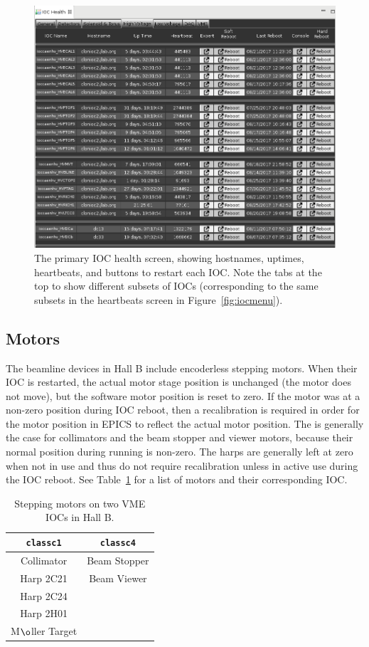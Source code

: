 \documentclass[amsmath,amssymb,notitlepage,11pt]{revtex4}
\begin{document}
\begin{figure}[htbp]\centering
  \includegraphics[width=\textwidth]{pics/iochealth}
  \caption{The primary IOC health screen, showing hostnames, uptimes, heartbeats, and buttons to restart each IOC.  Note the tabs at the top to show different subsets of IOCs (corresponding to the same subsets in the heartbeats screen in Figure~\ref{fig:iocmenu}).\label{fig:iochealth}}
\end{figure}

\subsection{Motors}
The beamline devices in Hall B include encoderless stepping motors.  When their IOC is restarted, the actual motor stage position is unchanged (the motor does not move), but the software motor position is reset to zero.  If the motor was at a non-zero position during IOC reboot, then a recalibration is required in order for the motor position in EPICS to reflect the actual motor position.  The is generally the case for collimators and the beam stopper and viewer motors, because their normal position during running is non-zero.  The harps are generally left at zero when not in use and thus do not require recalibration unless in active use during the IOC reboot.  See Table~\ref{tab:stepmot} for a list of motors and their corresponding IOC.
\vspace*{-1cm}\begin{table}[htpb]\centering
  \begin{tabular}{|c|c|} \hline
    \texttt{classc1} & \texttt{classc4} \\ \hline
    Collimator       & Beam Stopper \\
    Harp 2C21        & Beam Viewer \\
    Harp 2C24        & \\
    Harp 2H01        & \\
    M$\o$ller Target & \\ \hline
  \end{tabular}
  \caption{Stepping motors on two VME IOCs in Hall B.\label{tab:stepmot}}  
\end{table}
\end{document}
